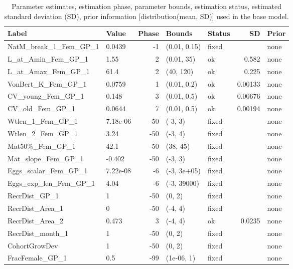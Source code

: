\documentclass[
]{scrartcl}
\begin{document}
\begin{landscape}
\begingroup
\fontsize{9.0pt}{10.8pt}\selectfont

\begin{longtable}{llrllrl}

\caption{\label{tbl-pars}Parameter estimates, estimation phase,
parameter bounds, estimation status, estimated standard deviation (SD),
prior information {[}distribution(mean, SD){]} used in the base model.}

\tabularnewline

\toprule
Label & Value & Phase & Bounds & Status & SD & Prior \\ 
\midrule\addlinespace[2.5pt]
NatM\_break\_1\_Fem\_GP\_1 & 0.0439 & -1 & (0.01, 0.15) & fixed &  & none \\ 
L\_at\_Amin\_Fem\_GP\_1 & 1.55 & 2 & (0.01, 35) & ok & 0.582 & none \\ 
L\_at\_Amax\_Fem\_GP\_1 & 61.4 & 2 & (40, 120) & ok & 0.225 & none \\ 
VonBert\_K\_Fem\_GP\_1 & 0.0759 & 1 & (0.01, 0.2) & ok & 0.00133 & none \\ 
CV\_young\_Fem\_GP\_1 & 0.148 & 3 & (0.01, 0.5) & ok & 0.00676 & none \\ 
CV\_old\_Fem\_GP\_1 & 0.0644 & 7 & (0.01, 0.5) & ok & 0.00194 & none \\ 
Wtlen\_1\_Fem\_GP\_1 & 7.18e-06 & -50 & (-3, 3) & fixed &  & none \\ 
Wtlen\_2\_Fem\_GP\_1 & 3.24 & -50 & (-3, 4) & fixed &  & none \\ 
Mat50\%\_Fem\_GP\_1 & 42.1 & -50 & (38, 45) & fixed &  & none \\ 
Mat\_slope\_Fem\_GP\_1 & -0.402 & -50 & (-3, 3) & fixed &  & none \\ 
Eggs\_scalar\_Fem\_GP\_1 & 7.22e-08 & -6 & (-3, 3e+05) & fixed &  & none \\ 
Eggs\_exp\_len\_Fem\_GP\_1 & 4.04 & -6 & (-3, 39000) & fixed &  & none \\ 
RecrDist\_GP\_1 & 1 & -50 & (0, 2) & fixed &  & none \\ 
RecrDist\_Area\_1 & 0 & -50 & (-4, 4) & fixed &  & none \\ 
RecrDist\_Area\_2 & 0.473 & 3 & (-4, 4) & ok & 0.0235 & none \\ 
RecrDist\_month\_1 & 1 & -50 & (0, 2) & fixed &  & none \\ 
CohortGrowDev & 1 & -50 & (0, 2) & fixed &  & none \\ 
FracFemale\_GP\_1 & 0.5 & -99 & (1e-06, 1) & fixed &  & none \\ 

\end{longtable}
\end{landscape}
\end{document}
